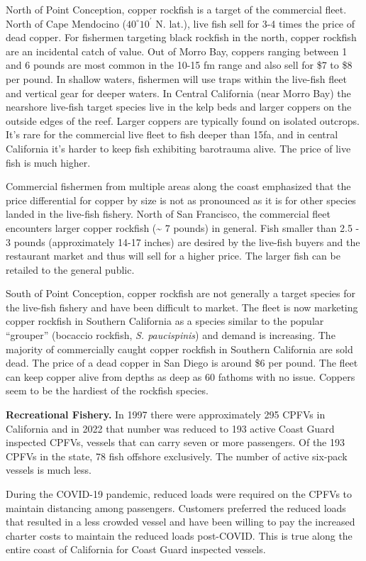 \documentclass[11pt,
  letterpaper,
]{article}
\begin{document}
North of Point Conception, copper rockfish is a target of the commercial fleet. North of Cape Mendocino ($40^\circ 10^\prime$ N. lat.), live fish sell for 3-4 times the price of dead copper. For fishermen targeting black rockfish in the north, copper rockfish are an incidental catch of value. Out of Morro Bay, coppers ranging between 1 and 6 pounds are most common in the 10-15 fm range and also sell for \$7 to \$8 per pound. In shallow waters, fishermen will use traps within the live-fish fleet and vertical gear for deeper waters. In Central California (near Morro Bay) the nearshore live-fish target species live in the kelp beds and larger coppers on the outside edges of the reef. Larger coppers are typically found on isolated outcrops. It's rare for the commercial live fleet to fish deeper than 15fa, and in central California it's harder to keep fish exhibiting barotrauma alive. The price of live fish is much higher.

Commercial fishermen from multiple areas along the coast emphasized that the price differential for copper by size is not as pronounced as it is for other species landed in the live-fish fishery. North of San Francisco, the commercial fleet encounters larger copper rockfish (\textasciitilde{} 7 pounds) in general. Fish smaller than 2.5 - 3 pounds (approximately 14-17 inches) are desired by the live-fish buyers and the restaurant market and thus will sell for a higher price. The larger fish can be retailed to the general public.

South of Point Conception, copper rockfish are not generally a target species for the live-fish fishery and have been difficult to market. The fleet is now marketing copper rockfish in Southern California as a species similar to the popular ``grouper'' (bocaccio rockfish, \emph{S. paucispinis}) and demand is increasing. The majority of commercially caught copper rockfish in Southern California are sold dead. The price of a dead copper in San Diego is around \$6 per pound. The fleet can keep copper alive from depths as deep as 60 fathoms with no issue. Coppers seem to be the hardiest of the rockfish species.

\textbf{Recreational Fishery.} In 1997 there were approximately 295 CPFVs in California and in 2022 that number was reduced to 193 active Coast Guard inspected CPFVs, vessels that can carry seven or more passengers. Of the 193 CPFVs in the state, 78 fish offshore exclusively. The number of active six-pack vessels is much less.

During the COVID-19 pandemic, reduced loads were required on the CPFVs to maintain distancing among passengers. Customers preferred the reduced loads that resulted in a less crowded vessel and have been willing to pay the increased charter costs to maintain the reduced loads post-COVID. This is true along the entire coast of California for Coast Guard inspected vessels.
\end{document}

